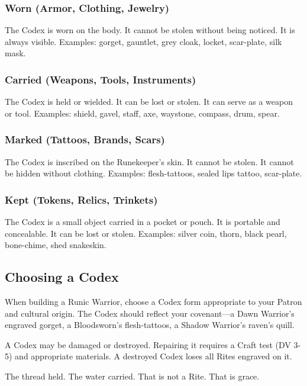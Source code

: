 \subsubsection*{Worn (Armor, Clothing, Jewelry)}
The Codex is worn on the body. It cannot be stolen without being noticed. It is always visible. Examples: gorget, gauntlet, grey cloak, locket, scar-plate, silk mask.

\subsubsection*{Carried (Weapons, Tools, Instruments)}
The Codex is held or wielded. It can be lost or stolen. It can serve as a weapon or tool. Examples: shield, gavel, staff, axe, waystone, compass, drum, spear.

\subsubsection*{Marked (Tattoos, Brands, Scars)}
The Codex is inscribed on the Runekeeper's skin. It cannot be stolen. It cannot be hidden without clothing. Examples: flesh-tattoos, sealed lips tattoo, scar-plate.

\subsubsection*{Kept (Tokens, Relics, Trinkets)}
The Codex is a small object carried in a pocket or pouch. It is portable and concealable. It can be lost or stolen. Examples: silver coin, thorn, black pearl, bone-chime, shed snakeskin.

\subsection*{Choosing a Codex}

When building a Runic Warrior, choose a Codex form appropriate to your Patron and cultural origin. The Codex should reflect your covenant—a Dawn Warrior's engraved gorget, a Bloodsworn's flesh-tattoos, a Shadow Warrior's raven's quill.

A Codex may be damaged or destroyed. Repairing it requires a Craft test (DV 3-5) and appropriate materials. A destroyed Codex loses all Rites engraved on it.

The thread held. The water carried. That is not a Rite. That is grace.

